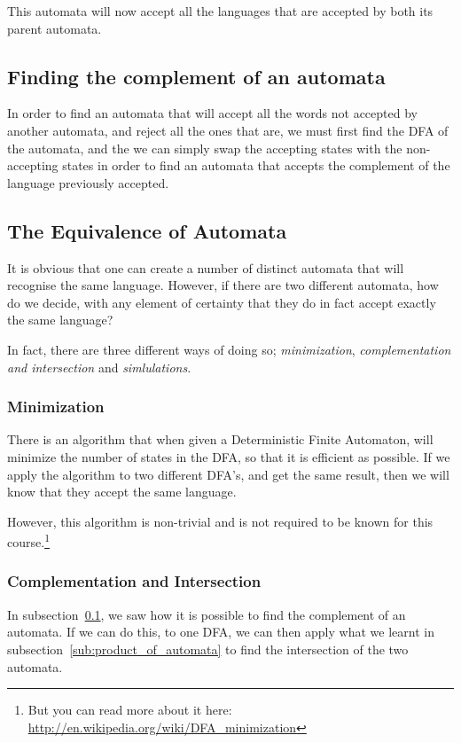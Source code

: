 This automata will now accept all the languages that are accepted by both its
parent automata.

\subsection{Finding the complement of an automata}
\label{sub:complement_of_automata}

In order to find an automata that will accept all the words not accepted by
another automata, and reject all the ones that are, we must first find the DFA
of the automata, and the we can simply swap the accepting states with the
non-accepting states in order to find an automata that accepts the complement
of the language previously accepted.

\subsection{The Equivalence of Automata}

It is obvious that one can create a number of distinct automata that will
recognise the same language. However, if there are two different automata, how
do we decide, with any element of certainty that they do in fact accept exactly
the same language?

In fact, there are three different ways of doing so; {\it minimization},
{\it complementation and intersection} and {\it simlulations}.

\subsubsection{Minimization}

There is an algorithm that when given a Deterministic Finite Automaton, will
minimize the number of states in the DFA, so that it is efficient as possible.
If we apply the algorithm to two different DFA's, and get the same result, then
we will know that they accept the same language.

However, this algorithm is non-trivial and is not required to be known for this
course.\footnote{But you can read more about it here:
\url{http://en.wikipedia.org/wiki/DFA_minimization}}

\subsubsection{Complementation and Intersection}

In subsection~\ref{sub:complement_of_automata}, we saw how it is possible to
find the complement of an automata. If we can do this, to one DFA, we can then
apply what we learnt in subsection~\ref{sub:product_of_automata} to find the
intersection of the two automata.

